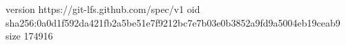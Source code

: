 version https://git-lfs.github.com/spec/v1
oid sha256:0a0d1f592da421fb2a5be51e7f9212bc7e7b03e0b3852a9fd9a5004eb19ceab9
size 174916
